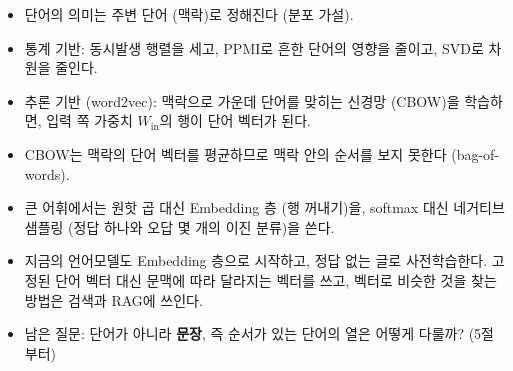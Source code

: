 \documentclass[aspectratio=169,11pt]{beamer}
\begin{document}
\begin{frame}
\vskip2mm
\begin{mlbox}[1--4절 정리]
\small
\begin{itemize}
\item 단어의 의미는 주변 단어 (맥락)로 정해진다 (분포 가설).
\item 통계 기반: 동시발생 행렬을 세고, PPMI로 흔한 단어의 영향을 줄이고, SVD로 차원을 줄인다.
\item 추론 기반 (word2vec): 맥락으로 가운데 단어를 맞히는 신경망 (CBOW)을 학습하면, 입력 쪽 가중치 $W_{\text{in}}$의 행이 단어 벡터가 된다.
\item CBOW는 맥락의 단어 벡터를 평균하므로 맥락 안의 순서를 보지 못한다 (bag-of-words).
\item 큰 어휘에서는 원핫 곱 대신 Embedding 층 (행 꺼내기)을, softmax 대신 네거티브 샘플링 (정답 하나와 오답 몇 개의 이진 분류)을 쓴다.
\item 지금의 언어모델도 Embedding 층으로 시작하고, 정답 없는 글로 사전학습한다.
고정된 단어 벡터 대신 문맥에 따라 달라지는 벡터를 쓰고, 벡터로 비슷한 것을 찾는 방법은 검색과 RAG에 쓰인다.
\item 남은 질문: 단어가 아니라 \textbf{문장}, 즉 순서가 있는 단어의 열은 어떻게 다룰까? (5절부터)
\end{itemize}
\end{mlbox}
\end{frame}
\end{document}
